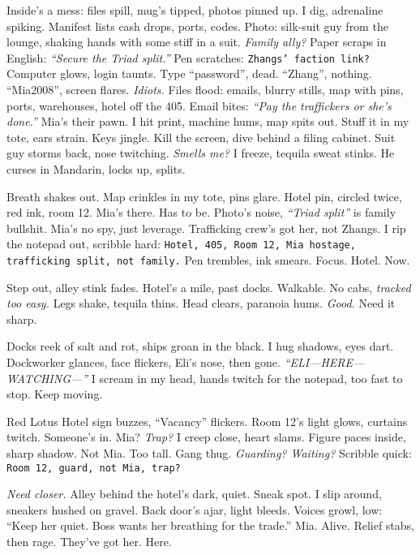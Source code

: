 \documentclass[12pt]{article}
\newcommand{\note}[1]{\texttt{#1}}
\begin{document}
{Inside’s a mess: files spill, mug’s tipped, photos pinned up. I dig, adrenaline spiking. Manifest lists cash drops, ports, codes. Photo: silk-suit guy from the lounge, shaking hands with some stiff in a suit. \textit{Family ally?} Paper scraps in English: \textit{“Secure the Triad split.”} Pen scratches: \note{Zhangs’ faction link?} Computer glows, login taunts. Type “password”, dead. “Zhang”, nothing. “Mia2008”, screen flares. \textit{Idiots.} Files flood: emails, blurry stills, map with pins, ports, warehouses, hotel off the 405. Email bites: \textit{“Pay the traffickers or she’s done.”} \textnormal{Mia}’s their pawn. I hit print, machine hums, map spits out. Stuff it in my tote, ears strain. Keys jingle. Kill the screen, dive behind a filing cabinet. Suit guy storms back, nose twitching. \textit{Smells me?} I freeze, tequila sweat stinks. He curses in Mandarin, locks up, splits.

Breath shakes out. Map crinkles in my tote, pins glare. Hotel pin, circled twice, red ink, room 12. \textnormal{Mia}’s there. Has to be. Photo’s noise, \textit{“Triad split”} is family bullshit. \textnormal{Mia}’s no spy, just leverage. Trafficking crew’s got her, not Zhangs. I rip the notepad out, scribble hard: \note{Hotel, 405, Room 12, Mia hostage, trafficking split, not family.} Pen trembles, ink smears. Focus. Hotel. Now.

Step out, alley stink fades. Hotel’s a mile, past docks. Walkable. No cabs, \textit{tracked too easy.} Legs shake, tequila thins. Head clears, paranoia hums. \textit{Good.} Need it sharp.

Docks reek of salt and rot, ships groan in the black. I hug shadows, eyes dart. Dockworker glances, face flickers, \textnormal{Eli}’s nose, then gone. \textit{“ELI—HERE—WATCHING—”} I scream in my head, hands twitch for the notepad, too fast to stop. Keep moving.

Red Lotus Hotel sign buzzes, “Vacancy” flickers. Room 12’s light glows, curtains twitch. Someone’s in. \textnormal{Mia}? \textit{Trap?} I creep close, heart slams. Figure paces inside, sharp shadow. Not \textnormal{Mia}. Too tall. Gang thug. \textit{Guarding? Waiting?} Scribble quick: \note{Room 12, guard, not Mia, trap?}

\textit{Need closer.} Alley behind the hotel’s dark, quiet. Sneak spot. I slip around, sneakers hushed on gravel. Back door’s ajar, light bleeds. Voices growl, low: “Keep her quiet. Boss wants her breathing for the trade.” \textnormal{Mia}. Alive. Relief stabs, then rage. They’ve got her. Here.

}
\end{document}
